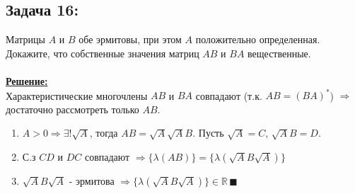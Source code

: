 \documentclass[a4paper,12pt,titlepage,final]{article}
\begin{document}
\subsection*{Задача 16:}
\noindent Матрицы $A$ и $B$ обе эрмитовы, при этом $A$ положительно определенная. Докажите, что собственные значения матриц $AB$ и $BA$ вещественные.\\ \\
\textbf{\underline{Решение:}} \\
Характеристические многочлены $AB$ и $BA$ совпадают (т.к. $AB = (BA)^*$) $\Rightarrow$ достаточно рассмотреть только $AB$. 
\begin{enumerate}
\item $A > 0 \Rightarrow \exists! \sqrt{A}$, тогда $AB = \sqrt{A}\sqrt{A}B$. Пусть $\sqrt{A} = C$, $\sqrt{A}B = D$.
\item С.з $CD$ и $DC$ совпадают $\Rightarrow \{\lambda(AB)\} = \{\lambda(\sqrt{A}B\sqrt{A})\}$
\item $\sqrt{A}B\sqrt{A}$ - эрмитова $\Rightarrow \{\lambda(\sqrt{A}B\sqrt{A})\} \in \mathbb{R} \,\blacksquare$ \\ \\ \\
\end{enumerate}

\end{document}
